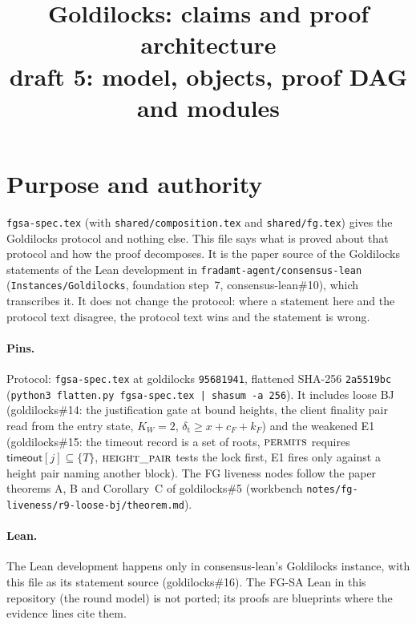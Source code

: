 \documentclass{article}
\title{Goldilocks: claims and proof architecture\\[2pt]
\large draft 5: model, objects, proof DAG and modules}
\author{}
\date{}
\newcommand{\fname}[1]{\text{\textsc{#1}}}
\newcommand{\cF}{c_F}
\begin{document}
\maketitle

\section{Purpose and authority}\label{sec:purpose}

\texttt{fgsa-spec.tex} (with \texttt{shared/composition.tex} and
\texttt{shared/fg.tex}) gives the Goldilocks protocol and nothing else.  This
file says what is proved about that protocol and how the proof decomposes.  It
is the paper source of the Goldilocks statements of the Lean development in
\texttt{fradamt-agent/consensus-lean} (\texttt{Instances/Goldilocks}, foundation
step~7, consensus-lean\#10), which transcribes it.  It does not change the
protocol: where a statement here and the protocol text disagree, the protocol
text wins and the statement is wrong.

\paragraph{Pins.}  Protocol: \texttt{fgsa-spec.tex} at goldilocks
\texttt{95681941}, flattened SHA-256 \texttt{2a5519bc}
(\texttt{python3 flatten.py fgsa-spec.tex | shasum -a 256}).  It includes
loose BJ (goldilocks\#14: the justification gate at bound heights, the client
finality pair read from the entry state, $K_W=2$,
$\delta_{\mathrm t}\geq x+\cF+k_F$) and the weakened E1 (goldilocks\#15: the
timeout record is a set of roots, $\fname{permits}$ requires
$\mathsf{timeout}[j]\subseteq\{T\}$, $\fname{height\_pair}$ tests the lock
first, E1 fires only against a height pair naming another block).  The
FG liveness nodes follow the paper theorems A, B and Corollary~C of
goldilocks\#5 (workbench \texttt{notes/fg-liveness/r9-loose-bj/theorem.md}).

\paragraph{Lean.}  The Lean development happens only in consensus-lean's
Goldilocks instance, with this file as its statement source
(goldilocks\#16).  The FG-SA Lean in this repository (the round model) is not
ported; its proofs are blueprints where the evidence lines cite them.
\end{document}

